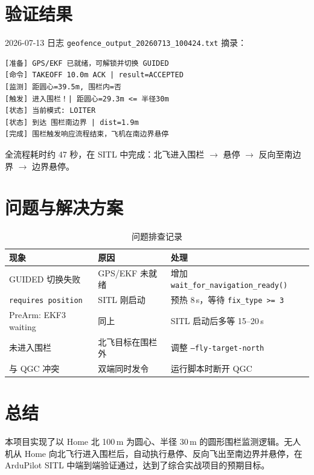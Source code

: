 \documentclass[12pt,a4paper]{article}
\begin{document}
\section{验证结果}

2026-07-13 日志 \texttt{geofence\_output\_20260713\_100424.txt} 摘录：

\begin{lstlisting}
[准备] GPS/EKF 已就绪，可解锁并切换 GUIDED
[命令] TAKEOFF 10.0m ACK | result=ACCEPTED
[监测] 距圆心=39.5m, 围栏内=否
[触发] 进入围栏！| 距圆心=29.3m <= 半径30m
[状态] 当前模式: LOITER
[状态] 到达 围栏南边界 | dist=1.9m
[完成] 围栏触发响应流程结束，飞机在南边界悬停
\end{lstlisting}

全流程耗时约 47 秒，在 SITL 中完成：北飞进入围栏 $\to$ 悬停 $\to$ 反向至南边界 $\to$ 边界悬停。

\section{问题与解决方案}

\begin{table}[htbp]
\centering
\caption{问题排查记录}
\begin{tabular}{p{3.2cm}p{4.8cm}p{5.5cm}}
\toprule
\textbf{现象} & \textbf{原因} & \textbf{处理} \\
\midrule
GUIDED 切换失败 & GPS/EKF 未就绪 & 增加 \texttt{wait\_for\_navigation\_ready()} \\
\texttt{requires position} & SITL 刚启动 & 预热 8\,s，等待 \texttt{fix\_type >= 3} \\
PreArm: EKF3 waiting & 同上 & SITL 启动后多等 15--20\,s \\
未进入围栏 & 北飞目标在围栏外 & 调整 \texttt{--fly-target-north} \\
与 QGC 冲突 & 双端同时发令 & 运行脚本时断开 QGC \\
\bottomrule
\end{tabular}
\end{table}

\section{总结}

本项目实现了以 Home 北 100\,m 为圆心、半径 30\,m 的圆形围栏监测逻辑。无人机从 Home 向北飞行进入围栏后，自动执行悬停、反向飞出至南边界并悬停，在 ArduPilot SITL 中端到端验证通过，达到了综合实战项目的预期目标。
\end{document}
